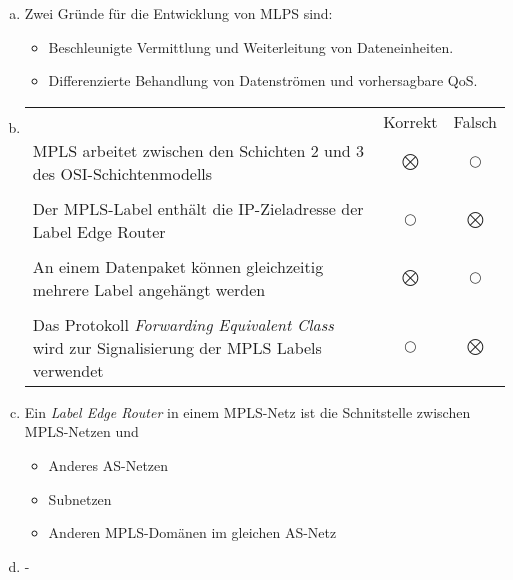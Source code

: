 \begin{enumerate}[a)]
	\item Zwei Gründe für die Entwicklung von MLPS sind:
	\begin{itemize}
		\item Beschleunigte Vermittlung und Weiterleitung von Dateneinheiten.
		\item Differenzierte Behandlung von Datenströmen und vorhersagbare QoS.
	\end{itemize}
	\item { \hfill 
	\begin{tabular}{p{11.2cm}cc}
													& Korrekt & Falsch \\
		MPLS arbeitet zwischen den Schichten 
		2 und 3 des OSI-Schichtenmodells			& $\bigotimes$   & $\bigcirc$ \\ \\
		Der MPLS-Label enthält die IP-Zieladresse 
		der Label Edge Router						& $\bigcirc$   & $\bigotimes$     \\ \\
		An einem Datenpaket können gleichzeitig 
		mehrere Label angehängt werden				& $\bigotimes$   & $\bigcirc$     \\ \\
		Das Protokoll \emph{Forwarding Equivalent 
		Class} wird zur Signalisierung der MPLS
		Labels verwendet							& $\bigcirc$   & $\bigotimes$     
	\end{tabular}}
	\item Ein \emph{Label Edge Router} in einem MPLS-Netz ist die Schnitstelle zwischen MPLS-Netzen und \begin{itemize}
		\item Anderes AS-Netzen
		\item Subnetzen
		\item Anderen MPLS-Domänen im gleichen AS-Netz
	\end{itemize}
	\item -
\end{enumerate}

